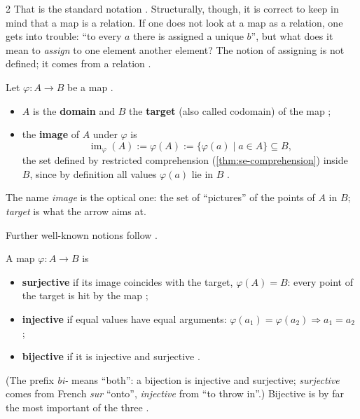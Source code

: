 \begin{paracol}{2}
That is the standard notation . Structurally, though, it is correct to keep in mind that a map is a
relation. If one does not look at a map as a relation, one gets into trouble: ``to every $a$ there is assigned a unique
$b$'', but what does it mean to \emph{assign} to one element another element? The notion of assigning is not defined;
it comes from a relation .

\begin{definition}\label{def:cl-image}
Let $\varphi\colon A\to B$ be a map .
\begin{itemize}
  \item $A$ is the \textbf{domain} and $B$ the \textbf{target} (also called codomain) of the map ;
  \item the \textbf{image} of $A$ under $\varphi$ is
        \[
          \operatorname{im}_\varphi(A):=\varphi(A):=\{\varphi(a)\mid a\in A\}\subseteq B,
        \]
        the set defined by restricted comprehension (\cref{thm:se-comprehension}) inside $B$, since by definition all values
        $\varphi(a)$ lie in $B$ .
\end{itemize}
\end{definition}
The name \emph{image} is the optical one: the set of ``pictures'' of the points of $A$ in $B$; \emph{target} is what
the arrow aims at.

Further well-known notions follow .

\begin{definition}\label{def:cl-bij}
A map $\varphi\colon A\to B$ is
\begin{itemize}
  \item \textbf{surjective} if its image coincides with the target, $\varphi(A)=B$: every point of the target is hit by
        the map ;
  \item \textbf{injective} if equal values have equal arguments: $\varphi(a_1)=\varphi(a_2)\Rightarrow a_1=a_2$
        ;
  \item \textbf{bijective} if it is injective and surjective .
\end{itemize}
\end{definition}
(The prefix \emph{bi-} means ``both'': a bijection is injective and surjective; \emph{surjective} comes from French
\emph{sur} ``onto'', \emph{injective} from ``to throw in''.) Bijective is by far the most important of the three .


\end{paracol}
